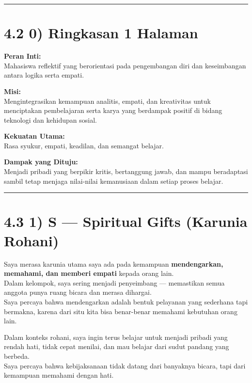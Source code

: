 \documentclass[
  letterpaper,
  DIV=11,
  numbers=noendperiod]{scrreprt}
\begin{document}
\begin{center}\rule{0.5\linewidth}{0.5pt}\end{center}

\section{4.2 0) Ringkasan 1 Halaman}\label{ringkasan-1-halaman}

\textbf{Peran Inti:}\\
Mahasiswa reflektif yang berorientasi pada pengembangan diri dan
keseimbangan antara logika serta empati.

\textbf{Misi:}\\
Mengintegrasikan kemampuan analitis, empati, dan kreativitas untuk
menciptakan pembelajaran serta karya yang berdampak positif di bidang
teknologi dan kehidupan sosial.

\textbf{Kekuatan Utama:}\\
Rasa syukur, empati, keadilan, dan semangat belajar.

\textbf{Dampak yang Dituju:}\\
Menjadi pribadi yang berpikir kritis, bertanggung jawab, dan mampu
beradaptasi sambil tetap menjaga nilai-nilai kemanusiaan dalam setiap
proses belajar.

\begin{center}\rule{0.5\linewidth}{0.5pt}\end{center}

\section{4.3 1) S --- Spiritual Gifts (Karunia
Rohani)}\label{s-spiritual-gifts-karunia-rohani}

Saya merasa karunia utama saya ada pada kemampuan \textbf{mendengarkan,
memahami, dan memberi empati} kepada orang lain.\\
Dalam kelompok, saya sering menjadi penyeimbang --- memastikan semua
anggota punya ruang bicara dan merasa dihargai.\\
Saya percaya bahwa mendengarkan adalah bentuk pelayanan yang sederhana
tapi bermakna, karena dari situ kita bisa benar-benar memahami kebutuhan
orang lain.

Dalam konteks rohani, saya ingin terus belajar untuk menjadi pribadi
yang rendah hati, tidak cepat menilai, dan mau belajar dari sudut
pandang yang berbeda.\\
Saya percaya bahwa kebijaksanaan tidak datang dari banyaknya bicara,
tapi dari kemampuan memahami dengan hati.
\end{document}
